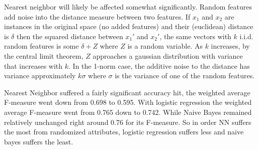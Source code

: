 \documentclass[12pt]{article}
\begin{document}
\begin{enumerate}
\begin{enumerate}
    Nearest neighbor will likely be affected somewhat significantly. Random
    features add noise into the distance measure between two features.
    If $x_1$ and $x_2$ are instances in the original space (no added features)
    and their (euclidean) distance is $\delta$ then the squared distance between
    $x_1'$ and $x_2'$, the same vectors with $k$ i.i.d. random features is
    some $\delta + Z$ where $Z$ is a random variable. As $k$ increases, by the
    central limit theorem, $Z$ approaches a gaussian distribution with variance
    that increases with $k$. In the 1-norm case, the additive noise to the
    distance has variance approximately $k\sigma$ where $\sigma$ is the
    variance of one of the random features.

Nearest Neighbor suffered a fairly significant accuracy hit, the weighted average F-measure went down from 0.698 to 0.595. With logistic regression the weighted average F-measure went from 0.765 down to  0.742. While Naive Bayes remained relatively unchanged right around 0.76 for its F-measure. So in order NN suffers the most from randomized attributes, logistic regression suffers less and naive bayes suffers the least.


\end{enumerate}
\end{enumerate}
\end{document}
